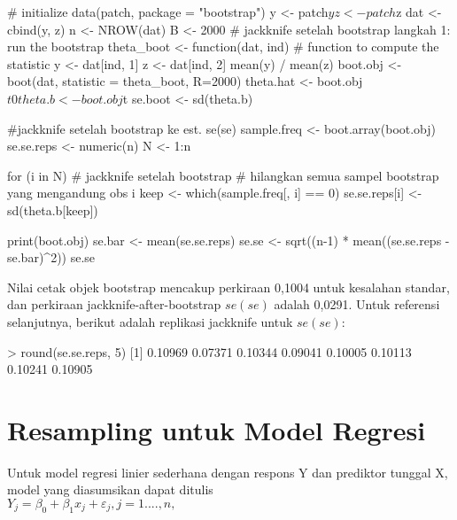 \documentclass[a4paper,12pt]{article}
\theoremstyle{definition}
\begin{document}
\begin{spverbatim}
    # initialize
data(patch, package = "bootstrap")
y <- patch$y
z <- patch$z
dat <- cbind(y, z)
n <- NROW(dat)
B <- 2000
# jackknife setelah bootstrap langkah 1: run the bootstrap
theta_boot <- function(dat, ind) {
# function to compute the statistic
y <- dat[ind, 1]
z <- dat[ind, 2]
mean(y) / mean(z)
}
boot.obj <- boot(dat, statistic = theta_boot, R=2000)
theta.hat <- boot.obj$t0
theta.b <- boot.obj$t
se.boot <- sd(theta.b)

#jackknife setelah bootstrap ke est. se(se)
sample.freq <- boot.array(boot.obj)
se.se.reps <- numeric(n)
N <- 1:n

for (i in N) {
    # jackknife setelah bootstrap
    # hilangkan semua sampel bootstrap yang mengandung obs i
keep <- which(sample.freq[, i] == 0)
se.se.reps[i] <- sd(theta.b[keep])
}

print(boot.obj)
se.bar <- mean(se.se.reps)
se.se <- sqrt((n-1) * mean((se.se.reps - se.bar)^2))
se.se
\end{spverbatim}

Nilai cetak objek bootstrap mencakup perkiraan 0,1004 untuk kesalahan standar, dan perkiraan jackknife-after-bootstrap $se(se)$ adalah 0,0291. Untuk referensi selanjutnya, berikut adalah replikasi jackknife untuk $se(se)$:\\
\begin{spverbatim}
    > round(se.se.reps, 5)
[1] 0.10969 0.07371 0.10344 0.09041 0.10005 0.10113 0.10241 0.10905
\end{spverbatim}



\section{Resampling untuk Model Regresi}

Untuk model regresi linier sederhana dengan respons Y dan prediktor tunggal X, model yang diasumsikan dapat ditulis\\

$Y_{j}=\beta _{0}+\beta _{1}x_{j}+\varepsilon _{j},j=1....,n,$ \\
\end{document}
